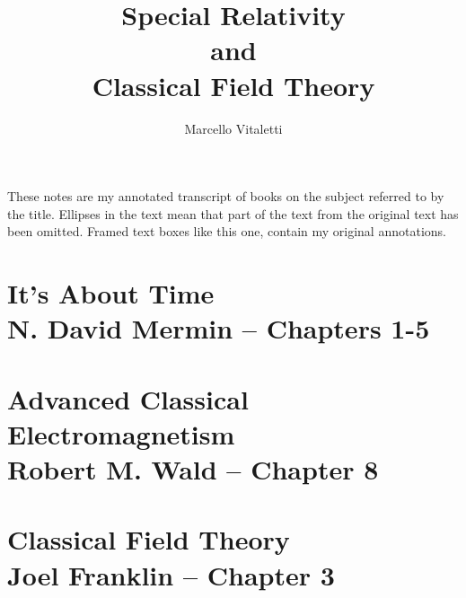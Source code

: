 \documentclass[english, 11pt]{book}
\begin{document}


\author{Marcello Vitaletti}
\title{Special Relativity\\and\\Classical Field Theory\\
{\small }}
\maketitle
\begin{mdframed}[leftmargin=-10pt,rightmargin=-10pt]
These notes are my annotated transcript of books on the subject referred to by the title. Ellipses in the text mean that part of the text from the original text has been omitted. Framed text boxes like this one, contain my original annotations.
\end{mdframed}


\frontmatter%

%

%	
\tableofcontents

\mainmatter%

\part{It's About Time\\{\normalsize N. David Mermin -- Chapters 1-5}}

\part{Advanced Classical Electromagnetism\\{\normalsize Robert M. Wald -- Chapter 8}}

\part{Classical Field Theory\\{\normalsize Joel Franklin -- Chapter 3}}
\end{document}
